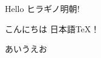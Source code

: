 \documentclass{ltjarticle}
\begin{document}
Hello \textsf{ヒラギノ明朝}!

こんにちは 日本語TeX！

あいうえお
\end{document}
